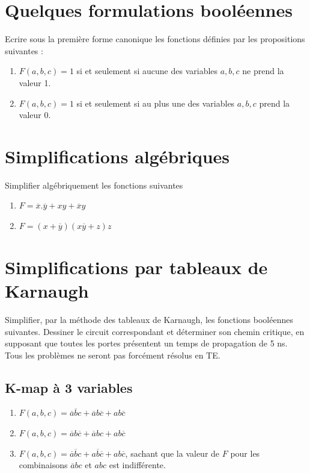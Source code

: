 \documentclass[a4paper,11pt]{article}
\begin{document}
\section{Quelques formulations booléennes}

Ecrire sous la première forme canonique les fonctions définies par les propositions suivantes :

\begin{enumerate}
\item $F(a,b,c)=1$ si et seulement si aucune des variables $a,b,c$ ne prend la valeur 1.
\item $F(a,b,c)=1$ si et seulement si au plus une des variables $a,b,c$ prend la valeur 0.
\end{enumerate}


\section{Simplifications algébriques}
Simplifier algébriquement les  fonctions suivantes

\begin{enumerate}
\item $F=\overline{x}.\overline{y} + xy+\overline{x}y$
\item $F=(x+\overline{y})(x\overline{y}+z)z$
\end{enumerate}


\section{Simplifications par tableaux de Karnaugh}
Simplifier, par la méthode des tableaux de Karnaugh, les fonctions booléennes suivantes. Dessiner le circuit correspondant et déterminer son chemin critique, en supposant que toutes les portes présentent un temps de propagation de 5 ns. Tous les problèmes ne seront pas forcément résolus en TE.

\subsection{K-map à 3 variables}
\begin{enumerate}
\item $F(a,b,c)=\overline{a}\overline{b}c+\overline{a}b\overline{c}+ab\overline{c}$
\item $F(a,b,c)=\overline{a}b\overline{c}+\overline{a}bc+ab\overline{c}$
\item $F(a,b,c)=\overline{a}\overline{b}c+a\overline{b}\overline{c}+ab\overline{c}$, sachant que la valeur de $F$ pour les combinaisons $\overline{a}bc$ et $abc$ est indifférente.
\end{enumerate}
\end{document}
